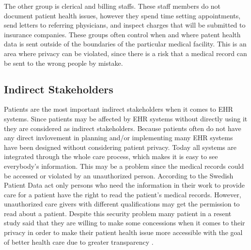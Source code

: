 \documentclass[14pt]{article}
\begin{document}
The other group is clerical and billing staffs. These staff members do not document patient health issues, however they spend time setting appointments, send letters to referring physicians, and inspect charges that will be submitted to insurance companies. These groups often control when and where patent health data is sent outside of the boundaries of the particular medical facility. This is an area where privacy can be violated, since there is a risk that a medical record can be sent to the wrong people by mistake. 

\subsection{Indirect Stakeholders}
\label{sec:peopleIndirect}
Patients are the most important indirect stakeholders when it comes to EHR systems. Since patients may be affected by EHR systems without directly using it they are considered as indirect stakeholders. Because patients often do not have any direct invlovement in planning and/or implementing many EHR systems have been designed without considering patient privacy. Today all systems are integrated through the whole care process, which makes it is easy to see everybody's information. This may be a problem since the medical records could be accessed or violated by an unauthorized person. According to the Swedish Patient Data act \cite{PatientDataAct} only persons who need the information in their work to provide care for a patient have the right to read the patient's medical records. However, unauthorized care givers with different qualifications may get the permission to read  about a  patient. Despite this security problem many patient in a resent study said that they are willing to make some concessions when it comes to their privacy in order to make their patient health issue more accessible with the goal of better health care due to greater transparency \cite{Merrill}.
\end{document}
